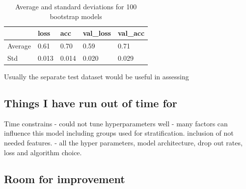 \documentclass[12pt]{article}
\begin{document}
    \begin{table}[]
        \begin{tabular}{|l|l|l|l|l|}
            \hline
            & loss & acc & val\_loss & val\_acc \\ \hline
            Average & 0.61 & 0.70 & 0.59 & 0.71     \\ \hline
            Std & 0.013 & 0.014 & 0.020 & 0.029    \\ \hline
        \end{tabular}
        \caption{Average and standard deviations for 100 bootstrap models}
        \label{table:boot}
    \end{table}

    Usually the separate test dataset would be useful in assessing

    \subsection{Things I have run out of time for}
    Time constrains
    - could not tune hyperparameters well
    - many factors can influence this model including groups used for stratification. inclusion of not needed features.
    - all the hyper parameters, model architecture, drop out rates, loss and algorithm choice.

    \subsection{Room for improvement}
\end{document}
